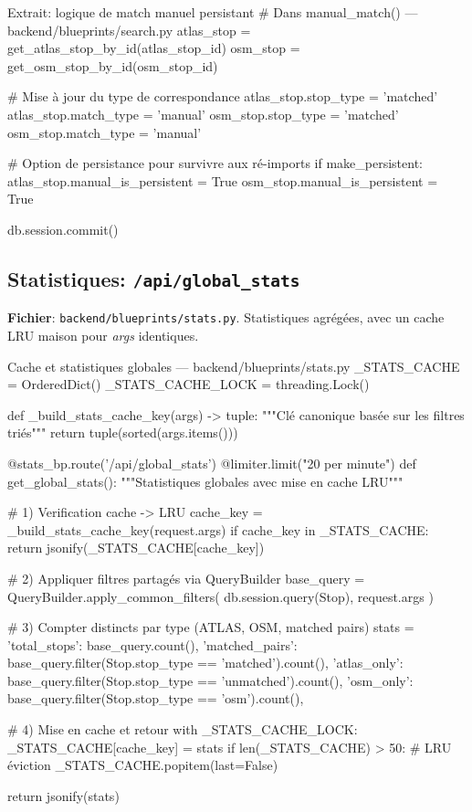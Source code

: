 \begin{codebox}[language=Python]{Extrait: logique de match manuel persistant}
# Dans manual_match() — backend/blueprints/search.py
atlas_stop = get_atlas_stop_by_id(atlas_stop_id)
osm_stop = get_osm_stop_by_id(osm_stop_id)

# Mise à jour du type de correspondance
atlas_stop.stop_type = 'matched'
atlas_stop.match_type = 'manual'
osm_stop.stop_type = 'matched'
osm_stop.match_type = 'manual'

# Option de persistance pour survivre aux ré-imports
if make_persistent:
    atlas_stop.manual_is_persistent = True
    osm_stop.manual_is_persistent = True

db.session.commit()
\end{codebox}

\subsection{Statistiques: \texttt{/api/global\_stats}}

\textbf{Fichier}: \texttt{backend/blueprints/stats.py}. Statistiques agrégées, avec un cache LRU maison pour \textit{args} identiques.

\begin{codebox}[language=Python]{Cache et statistiques globales — backend/blueprints/stats.py}
_STATS_CACHE = OrderedDict()
_STATS_CACHE_LOCK = threading.Lock()

def _build_stats_cache_key(args) -> tuple:
    """Clé canonique basée sur les filtres triés"""
    return tuple(sorted(args.items()))

@stats_bp.route('/api/global_stats')
@limiter.limit("20 per minute")
def get_global_stats():
    """Statistiques globales avec mise en cache LRU"""
    
    # 1) Verification cache -> LRU
    cache_key = _build_stats_cache_key(request.args)
    if cache_key in _STATS_CACHE:
        return jsonify(_STATS_CACHE[cache_key])
    
    # 2) Appliquer filtres partagés via QueryBuilder
    base_query = QueryBuilder.apply_common_filters(
        db.session.query(Stop), request.args
    )
    
    # 3) Compter distincts par type (ATLAS, OSM, matched pairs)
    stats = {
        'total_stops': base_query.count(),
        'matched_pairs': base_query.filter(Stop.stop_type == 'matched').count(),
        'atlas_only': base_query.filter(Stop.stop_type == 'unmatched').count(),
        'osm_only': base_query.filter(Stop.stop_type == 'osm').count(),
    }
    
    # 4) Mise en cache et retour
    with _STATS_CACHE_LOCK:
        _STATS_CACHE[cache_key] = stats
        if len(_STATS_CACHE) > 50:  # LRU éviction
            _STATS_CACHE.popitem(last=False)
    
    return jsonify(stats)
\end{codebox}


